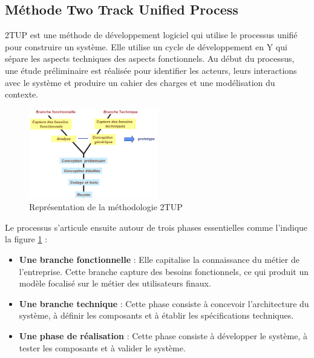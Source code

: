 \subsection{Méthode Two Track Unified Process}
2TUP est une méthode de développement logiciel qui utilise le processus unifié pour construire un système. Elle utilise un cycle de développement en Y qui sépare les aspects techniques des aspects fonctionnels. Au début du processus, une étude préliminaire est réalisée pour identifier les acteurs, leurs interactions avec le système et produire un cahier des charges et une modélisation du contexte.

\begin{figure}[ht]
    \centering
    \includegraphics[width=0.5\textwidth]{images/chapitre-1/2tup.png}
    \caption{Représentation de la méthodologie 2TUP }
    \label{fig:2tup-image}    
\end{figure}

Le processus s'articule ensuite autour de trois phases essentielles comme l'indique la figure \ref{fig:2tup-image} :
\begin{itemize}[itemsep=2pt, parsep=2pt]
    \item \textbf{Une branche fonctionnelle} : Elle capitalise la connaissance du métier de l’entreprise. Cette branche capture des besoins fonctionnels, ce qui produit un modèle focalisé sur le métier des utilisateurs finaux.
    \item \textbf{Une branche technique} : Cette phase consiste à concevoir l'architecture du système, à définir les composants et à établir les spécifications techniques.
    \item \textbf{Une phase de réalisation} : Cette phase consiste à développer le système, à tester les composants et à valider le système.
\end{itemize}
